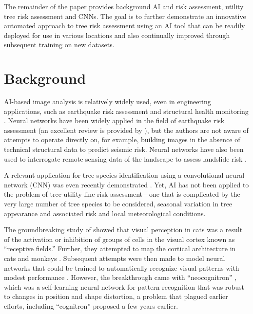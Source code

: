 \documentclass[11pt,twoside]{article}
\numberwithin{equation}{section}
\newcommand{\?}{\stackrel{?}{=}}
\begin{document}
The remainder of the paper provides background AI and risk assessment, utility tree risk assessment and CNNs. The goal is to further demonstrate an innovative automated approach to tree risk assessment using an AI tool that can be readily deployed for use in various locations and also continually improved through subsequent training on new datasets.



\section{Background}

AI-based image analysis is relatively widely used, even in engineering applications, such as earthquake risk assessment \cite{jiao2020artificial,salehi2018emerging} and structural health monitoring \cite{spencer2019advances}. Neural networks have been widely applied in the field of earthquake risk assessment (an excellent review is provided by \citet{xie2020promise}), but the authors are not aware of attempts to operate directly on, for example, building images in the absence of technical structural data to predict seismic risk.  Neural networks have also been used to interrogate remote sensing data of the landscape to assess landslide risk \cite{su2020deep}.


A relevant application for tree species identification using a convolutional neural network (CNN) was even recently demonstrated \cite{fricker2019convolutional}. Yet, AI has not been applied to the problem of tree-utility line risk assessment---one that is complicated by the very large number of tree species to be considered, seasonal variation in tree appearance and associated risk and local meteorological conditions. 


The groundbreaking study of \citet{hubel1959receptive} showed that visual perception in cats was a result of the
activation or inhibition of groups of cells in the visual cortex known as ``receptive fields.''  Further, they attempted
to map the cortical architecture in cats and monkeys \cite{hubel1962receptive,hubel1965receptive,hubel1968receptive}.
Subsequent attempts were then made to model neural networks that could be trained to automatically recognize visual patterns with modest performance \cite{rosenblatt1962principles,kabrisky1966proposed,giebel1971feature,fukushima1975cognitron}. However, the breakthrough came with ``neocognitron'' \cite{fukushima1980neocognitron}, which
was a self-learning neural network for pattern recognition that was robust to changes in position and shape distortion, a problem that plagued earlier efforts, including ``cognitron'' \cite{fukushima1975cognitron} proposed a few years earlier.
\end{document}
